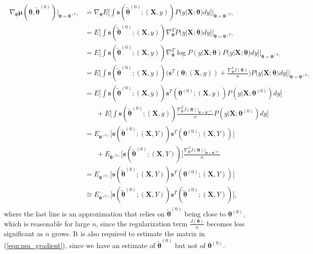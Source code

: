 \documentclass[twoside,11pt]{article}
\begin{document}
\begin{align}
\begin{aligned}
\nabla_{\bm{\theta}} \bm{\mu}(\bm { \theta}, \tilde{ \bm { \theta}} ^{ (0)}) |_{\bm{\theta} = \bm{\theta}^{(0)}} & = \nabla_{\bm{\theta}} E\big[\int \bm{s}(\tilde{ \bm { \theta}} ^{ (0)}; (\bm {X}, y)) P(y | \bm {X}; \bm{\theta}) dy \big] |_{\bm{\theta} = \bm{\theta}^{(0)}}  \\
& = E\big[\int \bm{s}( \tilde{ \bm { \theta}} ^{ (0)}; (\bm {X}, y)) \nabla^T_{\bm{\theta}} P(y | \bm {X}; \bm{\theta}) dy \big] |_{\bm{\theta} = \bm{\theta}^{(0)}} \\
& = E\big[\int \bm{s}( \tilde{ \bm { \theta}} ^{ (0)}; (\bm {X}, y)) \nabla^T_{\bm{\theta}} \log{P(y | \bm {X}; \bm{\theta})} P(y | \bm {X}; \bm{\theta}) dy \big] |_{\bm{\theta} = \bm{\theta}^{(0)}} \\
& = E\big[\int \bm{s}( \tilde{ \bm { \theta}} ^{ (0)}; (\bm {X}, y)) \big( \bm{s}^T(\bm{\theta};(\bm{X},y)) + \frac{\nabla^T_{\bm{\theta}}J(\bm{\theta})}{n} \big) P(y | \bm {X}; \bm{\theta}) dy \big] |_{\bm{\theta} = \bm{\theta}^{(0)}} \\
& = E\big[\int \bm{s}( \tilde{ \bm { \theta}} ^{ (0)}; (\bm {X}, y)) \bm{s}^T(\bm{\theta}^{(0)};(\bm{X},y)) P(y | \bm {X}; \bm{\theta}^{(0)}) dy \big] \\
& \hspace{20pt} +  E\big[\int \bm{s}( \tilde{ \bm { \theta}} ^{ (0)}; (\bm {X}, y)) \frac{\nabla^T_{\bm{\theta}}J(\bm{\theta}) |_{\bm{\theta} = \bm{\theta}^{(0)}}}{n} P(y | \bm {X}; {\bm{\theta}^{(0)}}) dy \big] \\
&  = E_{\bm { \theta}^{(0)}} \big[ \bm{s}( \tilde{ \bm { \theta}} ^{ (0)}; (\bm {X}, Y)) \bm{s}^T(\bm{\theta}^{(0)};(\bm{X},Y)) \big] \\
& \hspace{20pt} + E_{\bm { \theta}^{(0)}} \big[ \bm{s}( \tilde{ \bm { \theta}} ^{ (0)}; (\bm {X}, Y)) \big]\frac{\nabla^T_{\bm{\theta}}J(\bm{\theta}) |_{\bm{\theta} = \bm{\theta}^{(0)}}}{n} \\
&  = E_{\bm { \theta}^{(0)}} \big[ \bm{s}( \tilde{ \bm { \theta}} ^{ (0)}; (\bm {X}, Y)) \bm{s}^T(\bm{\theta}^{(0)};(\bm{X},Y)) \big] \\
& \cong E_{\bm { \theta}^{(0)}} \big[ \bm{s}( \tilde{ \bm { \theta}} ^{ (0)}; (\bm {X}, Y)) \bm{s}^T(\tilde{ \bm { \theta}} ^{ (0)};(\bm{X},Y)) \big],
\end{aligned}
\label{eqn:mu_gradient}
\end{align}
where the last line is an approximation that relies on $\tilde{ \bm { \theta}} ^{ (0)}$ being close to $\bm { \theta} ^{ (0)}$, which is reasonable for large $n$, since the regularization term $\frac{J(\bm{\theta})}{n}$ becomes less significant as $n$ grows. It is also required to estimate the matrix in (\ref{eqn:mu_gradient}), since we have an estimate of $\tilde{ \bm { \theta}} ^{ (0)}$ but not of $\bm { \theta} ^{ (0)}$. 
\end{document}

